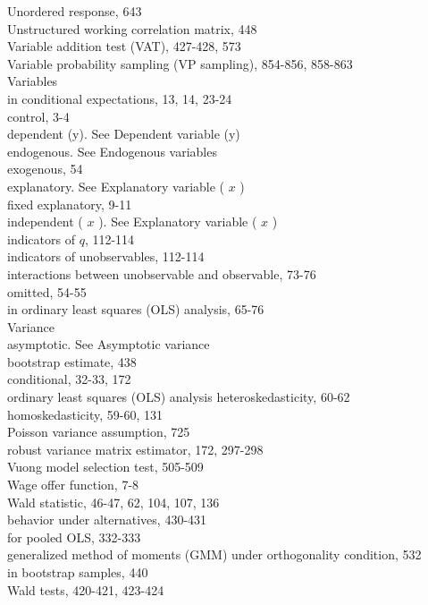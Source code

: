 \documentclass[10pt]{article}
\begin{document}
Unordered response, 643\\
Unstructured working correlation matrix, 448\\
Variable addition test (VAT), 427-428, 573\\
Variable probability sampling (VP sampling), 854-856, 858-863\\
Variables\\
in conditional expectations, 13, 14, 23-24\\
control, 3-4\\
dependent (y). See Dependent variable (y)\\
endogenous. See Endogenous variables\\
exogenous, 54\\
explanatory. See Explanatory variable ( $x$ )\\
fixed explanatory, 9-11\\
independent ( $x$ ). See Explanatory variable ( $x$ )\\
indicators of $q$, 112-114\\
indicators of unobservables, 112-114\\
interactions between unobservable and observable, 73-76\\
omitted, 54-55\\
in ordinary least squares (OLS) analysis, 65-76\\
Variance\\
asymptotic. See Asymptotic variance\\
bootstrap estimate, 438\\
conditional, 32-33, 172\\
ordinary least squares (OLS) analysis heteroskedasticity, 60-62\\
homoskedasticity, 59-60, 131\\
Poisson variance assumption, 725\\
robust variance matrix estimator, 172, 297-298\\
Vuong model selection test, 505-509\\
Wage offer function, 7-8\\
Wald statistic, 46-47, 62, 104, 107, 136\\
behavior under alternatives, 430-431\\
for pooled OLS, 332-333\\
generalized method of moments (GMM) under orthogonality condition, 532\\
in bootstrap samples, 440\\
Wald tests, 420-421, 423-424\\
\end{document}
